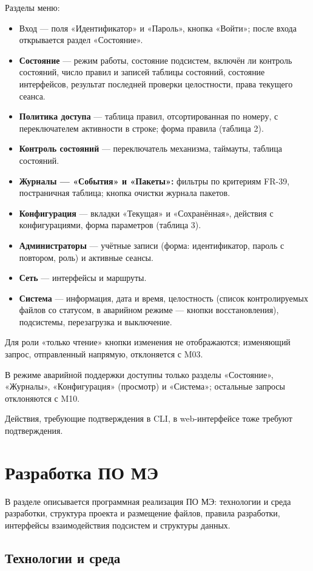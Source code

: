 \documentclass[13pt,a4paper,final]{article}
\begin{document}
	Разделы меню:
	\begin{itemize}
		\item Вход — поля «Идентификатор» и «Пароль», кнопка «Войти»; после входа открывается раздел «Состояние».
		\item \textbf{Состояние} — режим работы, состояние подсистем, включён ли контроль состояний, число правил и записей таблицы состояний, состояние интерфейсов, результат последней проверки целостности, права текущего сеанса.
		\item \textbf{Политика доступа} — таблица правил, отсортированная по номеру, с переключателем активности в строке; форма правила (таблица 2).
		\item \textbf{Контроль состояний} — переключатель механизма, таймауты, таблица состояний.
		\item \textbf{Журналы — «События» и «Пакеты»:} фильтры по критериям FR-39, постраничная таблица; кнопка очистки журнала пакетов.
		\item \textbf{Конфигурация} — вкладки «Текущая» и «Сохранённая», действия с конфигурациями, форма параметров (таблица 3).
		\item \textbf{Администраторы} — учётные записи (форма: идентификатор, пароль с повтором, роль) и активные сеансы.
		\item \textbf{Сеть} — интерфейсы и маршруты.
		\item \textbf{Система} — информация, дата и время, целостность (список контролируемых файлов со статусом, в аварийном режиме — кнопки восстановления), подсистемы, перезагрузка и выключение.
	\end{itemize}
	
	Для роли «только чтение» кнопки изменения не отображаются; изменяющий запрос, отправленный напрямую, отклоняется с M03.
	
	В режиме аварийной поддержки доступны только разделы «Состояние», «Журналы», «Конфигурация» (просмотр) и «Система»; остальные запросы отклоняются с M10.
	
	Действия, требующие подтверждения в CLI, в web-интерфейсе тоже требуют подтверждения.
	
	
	\section{Разработка ПО МЭ}
	В разделе описывается программная реализация ПО МЭ: технологии и среда разработки, структура проекта и размещение файлов, правила разработки, интерфейсы взаимодействия подсистем и структуры данных.
	\subsection{Технологии и среда}
\end{document}

